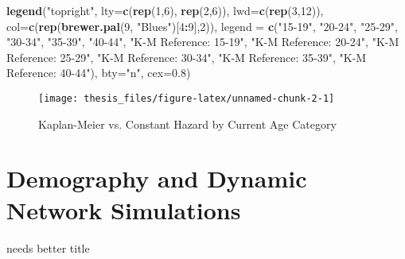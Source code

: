 \documentclass [11pt, proquest] {uwthesis}[2015/03/03]
\newenvironment{Shaded}{}{}
\newcommand{\KeywordTok}[1]{\textcolor[rgb]{0.00,0.44,0.13}{\textbf{{#1}}}}
\newcommand{\DataTypeTok}[1]{\textcolor[rgb]{0.56,0.13,0.00}{{#1}}}
\newcommand{\DecValTok}[1]{\textcolor[rgb]{0.25,0.63,0.44}{{#1}}}
\newcommand{\FloatTok}[1]{\textcolor[rgb]{0.25,0.63,0.44}{{#1}}}
\newcommand{\StringTok}[1]{\textcolor[rgb]{0.25,0.44,0.63}{{#1}}}
\newcommand{\NormalTok}[1]{{#1}}
\newcommand{\OperatorTok}[1]{\textcolor[rgb]{0.00,0.44,0.13}{\textbf{{#1}}}}
\begin{document}
\begin{Shaded}
\begin{Highlighting}[]
\KeywordTok{legend}\NormalTok{(}\StringTok{"topright"}\NormalTok{, }\DataTypeTok{lty=}\KeywordTok{c}\NormalTok{(}\KeywordTok{rep}\NormalTok{(}\DecValTok{1}\NormalTok{,}\DecValTok{6}\NormalTok{), }\KeywordTok{rep}\NormalTok{(}\DecValTok{2}\NormalTok{,}\DecValTok{6}\NormalTok{)), }\DataTypeTok{lwd=}\KeywordTok{c}\NormalTok{(}\KeywordTok{rep}\NormalTok{(}\DecValTok{3}\NormalTok{,}\DecValTok{12}\NormalTok{)), }
       \DataTypeTok{col=}\KeywordTok{c}\NormalTok{(}\KeywordTok{rep}\NormalTok{(}\KeywordTok{brewer.pal}\NormalTok{(}\DecValTok{9}\NormalTok{, }\StringTok{"Blues"}\NormalTok{)[}\DecValTok{4}\OperatorTok{:}\DecValTok{9}\NormalTok{],}\DecValTok{2}\NormalTok{)), }
       \DataTypeTok{legend =} \KeywordTok{c}\NormalTok{(}\StringTok{"15-19"}\NormalTok{, }\StringTok{"20-24"}\NormalTok{, }\StringTok{"25-29"}\NormalTok{, }\StringTok{"30-34"}\NormalTok{, }\StringTok{"35-39"}\NormalTok{, }\StringTok{"40-44"}\NormalTok{,}
                   \StringTok{"K-M Reference: 15-19"}\NormalTok{,}
                   \StringTok{"K-M Reference: 20-24"}\NormalTok{,}
                   \StringTok{"K-M Reference: 25-29"}\NormalTok{,}
                   \StringTok{"K-M Reference: 30-34"}\NormalTok{,}
                   \StringTok{"K-M Reference: 35-39"}\NormalTok{,}
                   \StringTok{"K-M Reference: 40-44"}\NormalTok{), }\DataTypeTok{bty=}\StringTok{"n"}\NormalTok{, }\DataTypeTok{cex=}\FloatTok{0.8}\NormalTok{)}
\end{Highlighting}
\end{Shaded}
\begin{figure}

{\centering \texttt{[image: thesis\_files/figure-latex/unnamed-chunk-2-1]} 

}

\caption{Kaplan-Meier vs. Constant Hazard by Current Age Category}\label{fig:unnamed-chunk-2}
\end{figure}
\chapter{Demography and Dynamic Network Simulations}\label{nets}

needs better title
\end{document}
